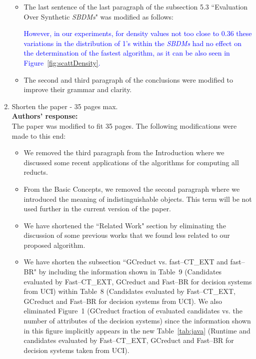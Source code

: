 \documentclass{letter}
\begin{document}
\begin{letter}{}
\begin{enumerate}
\begin{itemize}
		\item The last sentence of the last paragraph of the subsection 5.3 ``Evaluation Over Synthetic \textit{SBDMs}" was modified as follows:
		
		\textcolor{blue}{However, in our experiments, for density values not too close to 0.36 these variations in the distribution of 1's within the \textit{SBDMs} had no effect on the determination of the fastest algorithm, as it can be also seen in Figure~\ref{fig:scattDensity}.}
		
		\item The second and third paragraph of the conclusions were modified to improve their grammar and clarity.
		
	\end{itemize}
		 
	\item Shorten the paper - 35 pages max.\\
	\textbf{Authors’ response:} \\
	The paper was modified to fit 35 pages. The following modifications were made to this end:
	\begin{itemize}
		\item We removed the third paragraph from the Introduction where we discussed some recent applications of the algorithms for computing all reducts.
		
		\item From the  Basic Concepts, we removed the second paragraph where we introduced the meaning of indistinguishable objects. This term will be not used further in the current version of the paper.

		
		\item We have shortened the ``Related Work" section by eliminating the discussion of some previous works that we found less related to our proposed algorithm.
		
		
		\item We have shorten the subsection ``GCreduct vs. fast--CT\_EXT and fast--BR" by including the information shown in Table~9 (Candidates evaluated by Fast--CT\_EXT, GCreduct and Fast--BR for decision systems from UCI) within Table~8 (Candidates evaluated by Fast--CT\_EXT, GCreduct and Fast--BR for decision systems from UCI). We also eliminated Figure~1 (GCreduct fraction of evaluated candidates vs. the number of attributes of the decision systems) since the information shown in this figure implicitly appears in the new Table~\ref{tab:java} (Runtime and candidates evaluated by Fast--CT\_EXT, GCreduct and Fast--BR for decision systems taken from UCI).
		

\end{itemize}
\end{enumerate}
\end{letter}
\end{document}

